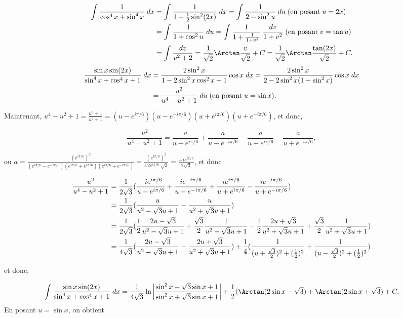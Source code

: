 {{\begin{align*}\ensuremath
\int_{}^{}\frac{1}{\cos^4x+\sin^4x}\;dx&=\int_{}^{}\frac{1}{1-\frac{1}{2}\sin^2(2x)}\;dx
=\int_{}^{}\frac{1}{2-\sin^2u}\;du\;(\mbox{en posant}\;u=2x)\\
 &=\int_{}^{}\frac{1}{1+\cos^2u}\;du=\int_{}^{}\frac{1}{1+\frac{1}{1+v^2}}\;\frac{dv}{1+v^2}\;(\mbox{en posant}\;v=\tan u)\\
 &=\int_{}^{}\frac{dv}{v^2+2}=\frac{1}{\sqrt{2}}\Arctan\frac{v}{\sqrt{2}}+C
=\frac{1}{\sqrt{2}}\Arctan\frac{\tan(2x)}{\sqrt{2}}+C.
\end{align*}
\begin{align*}\ensuremath
\frac{\sin x\sin(2x)}{\sin^4x+\cos^4x+1}\;dx&=\frac{2\sin^2x}{1-2\sin^2x\cos^2x+1}\cos x\;dx=\frac{2\sin^2x}{2-2\sin^2x(1-\sin^2x)}\cos x\;dx\\
 &=\frac{u^2}{u^4-u^2+1}\;du\;(\mbox{en posant}\;u=\sin x).
\end{align*}

Maintenant, $u^4-u^2+1=\frac{u^6+1}{u^2+1}=(u-e^{i\pi/6})(u-e^{-i\pi/6})(u+e^{i\pi/6})(u+e^{-i\pi/6})$, et donc,

$$\frac{u^2}{u^4-u^2+1}=\frac{a}{u-e^{i\pi/6}}+\frac{\overline{a}}{u-e^{-i\pi/6}}-\frac{a}{u+e^{i\pi/6}}-\frac{\overline{a}}{u+e^{-i\pi/6}},$$

ou $a=\frac{(e^{i\pi/6})^2}{(e^{i\pi/6}-e^{-i\pi/6})(e^{i\pi/6}+e^{i\pi/6})(e^{i\pi/6}+e^{-i\pi/6})}=
\frac{(e^{i\pi/6})^2}{i.2e^{i\pi/6}.\sqrt{3}}=\frac{-ie^{i\pi/6}}{2\sqrt{3}}$, et donc

\begin{align*}\ensuremath
\frac{u^2}{u^4-u^2+1}&=\frac{1}{2\sqrt{3}}(\frac{-ie^{i\pi/6}}{u-e^{i\pi/6}}+\frac{ie^{-i\pi/6}}{u-e^{-i\pi/6}}+\frac{ie^{i\pi/6}}{u+e^{i\pi/6}}-\frac{ie^{-i\pi/6}}{u+e^{-i\pi/6}})\\
 &=\frac{1}{2\sqrt{3}}(\frac{u}{u^2-\sqrt{3}u+1}-\frac{u}{u^2+\sqrt{3}u+1})\\
 &=\frac{1}{2\sqrt{3}}(\frac{1}{2}\frac{2u-\sqrt{3}}{u^2-\sqrt{3}u+1}+\frac{\sqrt{3}}{2}\frac{1}
 {u^2-\sqrt{3}u+1}-\frac{1}{2}\frac{2u+\sqrt{3}}{u^2+\sqrt{3}u+1}+\frac{\sqrt{3}}{2}\frac{1}{u^2+\sqrt{3}u+1})\\
 &=\frac{1}{4\sqrt{3}}(\frac{2u-\sqrt{3}}{u^2-\sqrt{3}u+1}-\frac{2u+\sqrt{3}}{u^2+\sqrt{3}u+1})
 +\frac{1}{4}(\frac{1}{(u+\frac{\sqrt{3}}{2})^2+(\frac{1}{2})^2}+
 \frac{1}{(u-\frac{\sqrt{3}}{2})^2+(\frac{1}{2})^2})
\end{align*}

et donc,

$$\int_{}^{}\frac{\sin x\sin(2x)}{\sin^4x+\cos^4x+1}\;dx=\frac{1}{4\sqrt{3}}\ln\left|
\frac{\sin^2x-\sqrt{3}\sin x+1}{\sin^2x+\sqrt{3}\sin x+1}\right|+\frac{1}{2}(\Arctan(2\sin x-\sqrt{3})+\Arctan(2\sin x+\sqrt{3})+C.$$
En posant $u=\sin x$, on obtient 

}}
